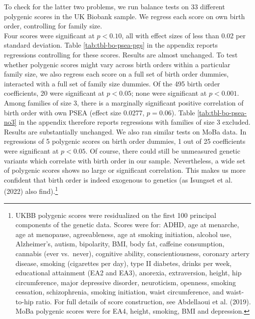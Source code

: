 \documentclass[
  12pt,
]{article}
\newcounter{none} %
\theoremstyle{definition}
\theoremstyle{definition}
\theoremstyle{definition}
\theoremstyle{definition}
\theoremstyle{remark}
\begin{document}
To check for the latter two problems, we run balance tests on 33
different polygenic scores in the UK Biobank sample. We regress each
score on own birth order, controlling for family size.\\
Four scores were significant at \(p < 0.10\), all with effect sizes of
less than 0.02 per standard deviation. Table \ref{tab:tbl-bo-psea-pgs}
in the appendix reports regressions controlling for these scores.
Results are almost unchanged. To test whether polygenic scores might
vary across birth orders within a particular family size, we also
regress each score on a full set of birth order dummies, interacted with
a full set of family size dummies. Of the 495 birth order
coefficients, 20 were significant at \(p < 0.05\);
none were significant at \(p < 0.001\). Among families of size 3, there is
a marginally significant positive correlation of birth order with own
PSEA (effect size 0.0277,
\(p = 0.06\)). Table \ref{tab:tbl-bo-psea-no3}
in the appendix therefore reports regressions with families of size 3
excluded. Results are substantially unchanged. We also ran similar tests
on MoBa data. In regressions of 5 polygenic scores on
birth order dummies, 1 out of 25 coefficients
were significant at \(p < 0.05\). Of course, there could still be
unmeasured genetic variants which correlate with birth order in our
sample. Nevertheless, a wide set of polygenic scores shows no large or
significant correlation. This makes us more confident that birth order
is indeed exogenous to genetics (as Isungset et al. (2022) also find).\footnote{UKBB polygenic scores were residualized on the first 100
  principal components of the genetic data. Scores were for: ADHD, age
  at menarche, age at menopause, agreeableness, age at smoking
  initiation, alcohol use, Alzheimer's, autism, bipolarity, BMI, body
  fat, caffeine consumption, cannabis (ever vs.~never), cognitive
  ability, conscientiousness, coronary artery disease, smoking
  (cigarettes per day), type II diabetes, drinks per week, educational
  attainment (EA2 and EA3), anorexia, extraversion, height, hip
  circumference, major depressive disorder, neuroticism, openness,
  smoking cessation, schizophrenia, smoking initiation, waist
  circumference, and waist-to-hip ratio. For full details of score
  construction, see {Abdellaoui et al.} (2019). MoBa polygenic scores were
  for EA4, height, smoking, BMI and depression.}
\end{document}
